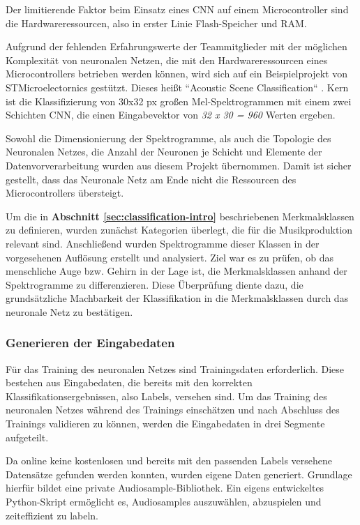 Der limitierende Faktor beim Einsatz eines CNN auf einem Microcontroller sind die Hardwareressourcen, also in erster Linie Flash-Speicher und RAM.

Aufgrund der fehlenden Erfahrungswerte der Teammitglieder mit der möglichen Komplexität von neuronalen Netzen, die mit den Hardwareressourcen eines Microcontrollers betrieben werden können, wird sich auf ein Beispielprojekt von STMicroelectornics gestützt. Dieses heißt ``Acoustic Scene Classification`` \cite{stm-asc}\cite{stm-asc-2}. Kern ist die Klassifizierung von 30x32 px großen Mel-Spektrogrammen mit einem zwei Schichten CNN, die einen Eingabevektor von \textit{32 x 30 = 960} Werten ergeben. 

Sowohl die Dimensionierung der Spektrogramme, als auch die Topologie des Neuronalen Netzes, die Anzahl der Neuronen je Schicht und Elemente der Datenvorverarbeitung wurden aus diesem Projekt übernommen. Damit ist sicher gestellt, dass das Neuronale Netz am Ende nicht die Ressourcen des Microcontrollers übersteigt.

Um die in \textbf{Abschnitt \ref{sec:classification-intro}} beschriebenen Merkmalsklassen zu definieren, wurden zunächst Kategorien überlegt, die für die Musikproduktion relevant sind. Anschließend wurden Spektrogramme dieser Klassen in der vorgesehenen Auflösung erstellt und analysiert. Ziel war es zu prüfen, ob das menschliche Auge bzw. Gehirn in der Lage ist, die Merkmalsklassen anhand der Spektrogramme zu differenzieren. Diese Überprüfung diente dazu, die grundsätzliche Machbarkeit der Klassifikation in die Merkmalsklassen durch das neuronale Netz zu bestätigen.


\subsubsection{Generieren der Eingabedaten}
\label{sec:input-data-generation}
Für das Training des neuronalen Netzes sind Trainingsdaten erforderlich. Diese bestehen aus Eingabedaten, die bereits mit den korrekten Klassifikationsergebnissen, also Labels, versehen sind. Um das Training des neuronalen Netzes während des Trainings einschätzen und nach Abschluss des Trainings validieren zu können, werden die Eingabedaten in drei Segmente aufgeteilt.

Da online keine kostenlosen und bereits mit den passenden Labels versehene Datensätze gefunden werden konnten, wurden eigene Daten generiert. Grundlage hierfür bildet eine private Audiosample-Bibliothek. Ein eigens entwickeltes Python-Skript ermöglicht es, Audiosamples auszuwählen, abzuspielen und zeiteffizient zu labeln.

